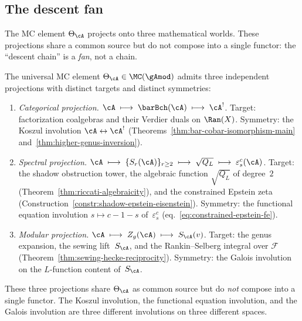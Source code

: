 \subsection{The descent fan}
\label{subsec:concordance-descent-fan}

The MC element $\Theta_\cA$ projects onto three
mathematical worlds. These projections share a common
source but do not compose into a single functor: the
``descent chain'' is a \emph{fan}, not a chain.

\begin{proposition}
\label{prop:descent-fan}
The universal MC element $\Theta_\cA \in \MC(\gAmod)$
admits three independent projections with distinct targets
and distinct symmetries:
\begin{enumerate}[label=\textup{(\roman*)}]
\item \emph{Categorical projection.}
 $\cA \;\longmapsto\; \barBch(\cA) \;\longmapsto\; \cA^!$.
 Target: factorization coalgebras and their Verdier duals
 on $\Ran(X)$.
 Symmetry: the Koszul involution
 $\cA \leftrightarrow \cA^!$
 (Theorems~\textup{\ref{thm:bar-cobar-isomorphism-main}}
 and~\textup{\ref{thm:higher-genus-inversion}}).

\item \emph{Spectral projection.}
 $\cA \;\longmapsto\; \{S_r(\cA)\}_{r \ge 2}
 \;\longmapsto\; \sqrt{Q_L}
 \;\longmapsto\; \varepsilon^c_s(\cA)$.
 Target: the shadow obstruction tower, the algebraic function
 $\sqrt{Q_L}$ of degree~$2$
 (Theorem~\textup{\ref{thm:riccati-algebraicity}}),
 and the constrained Epstein zeta
 (Construction~\textup{\ref{constr:shadow-epstein-eisenstein}}).
 Symmetry: the functional equation involution
 $s \mapsto c - 1 - s$
 of~$\varepsilon^c_s$
 \textup{(}eq.~\textup{\eqref{eq:constrained-epstein-fe}}\textup{)}.

\item \emph{Modular projection.}
 $\cA \;\longmapsto\; Z_g(\cA)
 \;\longmapsto\; S_\cA(v)$.
 Target: the genus expansion, the sewing lift~$S_\cA$, and
 the Rankin--Selberg integral over $\mathcal{F}$
 (Theorem~\textup{\ref{thm:sewing-hecke-reciprocity}}).
 Symmetry: the Galois involution on the $L$-function
 content of~$S_\cA$.
\end{enumerate}
These three projections share $\Theta_\cA$ as common
source but do \emph{not} compose into a single functor.
The Koszul involution, the functional equation
involution, and the Galois involution are three
different involutions on three different spaces.
\end{proposition}

